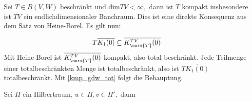 \begin{ex}\label{finite_rank_compakt} Sei $T \in B(V, W)$ beschränkt und $\text{dim}{TV} < \infty,$ dann ist $T$ kompakt insbesondere ist $TV$ ein endlichdimensionaler Banchraum. Dies ist eine direkte Konsequenz aus dem Satz von Heine-Borel. Es gilt nun:
	
	
	\[T\overline{K_1(0)} \subseteq \overline{K^{TV}_{\norm{T}}(0)}\]
	Mit Heine-Borel ist $\overline{K^{TV}_{\norm{T}}(0)}$ kompakt, also total beschränkt.  Jede Teilmenge einer totalbeschränkten Menge ist totalbeschränkt, also ist $T\overline{K_1(0)}$ totalbeschränkt. Mit \ref{kmp_gdw_tot} folgt die Behauptung.
	
\end{ex}


\begin{ex} Sei $H$ ein Hilbertraum, $u \in H, v \in H',$ dann 
	
\end{ex}


